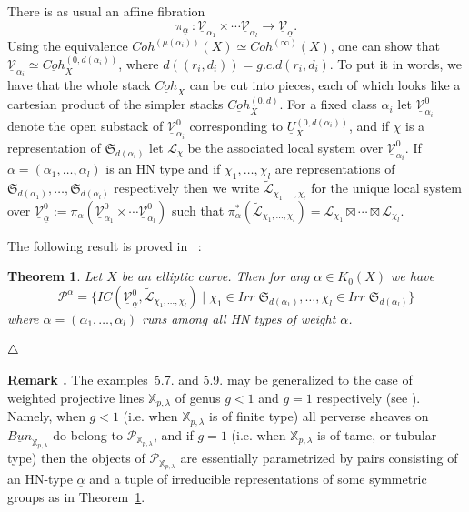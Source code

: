 \documentclass[a4paper,10pt]{amsart}
\def\endexample{$\hfill \triangle$}
\def\endexample{$\hfill \triangle$}
\def\a{\alpha}
\newtheorem{theo}{\bf{Theorem}}[section]
\numberwithin{equation}{section}
\begin{document}
There is as usual an affine fibration
$$\pi_{\underline{\a}}~: \underline{\mathcal{V}}_{\a_1} \times \cdots \underline{\mathcal{V}}_{\a_l} \to \underline{\mathcal{V}}_{\underline{\a}}.$$
Using the equivalence $Coh^{(\mu(\a_i))}(X) \simeq Coh^{(\infty)}(X)$, one can show that $\underline{\mathcal{V}}_{\a_i} \simeq \underline{Coh}_X^{(0,d(\a_i))}$, where $d((r_i,d_i))=g.c.d(r_i,d_i)$. To put it in words, we have that the whole stack $\underline{Coh}_X$ can be cut into pieces, each of which looks like a cartesian product of the simpler stacks $\underline{Coh}_X^{(0,d)}$. For a fixed class $\a_i$ let $\underline{\mathcal{V}}_{\a_i}^0$ denote the open substack of $\underline{\mathcal{V}}_{\a_i}^0$ corresponding to $\underline{U}_X^{(0,d(\a_i))}$, and if $\chi$ is a representation of $\mathfrak{S}_{d(\a_i)}$ let $\mathcal{L}_{\chi}$ be the associated local system over $\underline{\mathcal{V}}_{\a_i}^0$. If $\a=(\a_1, \ldots, \a_l)$ is an HN type and if $\chi_1, \ldots, \chi_l$ are representations of $\mathfrak{S}_{d(\a_1)}, \ldots, \mathfrak{S}_{d(\a_l)}$ respectively then we write $\widetilde{\mathcal{L}}_{\chi_1, \ldots, \chi_l}$ for the unique local system over $\underline{\mathcal{V}}^0_{\underline{\a}}:=\pi_{\a}(\underline{\mathcal{V}}_{\a_1}^0 \times \cdots \underline{\mathcal{V}}_{\a_l}^0)$ such that $\pi_{\a}^*(\widetilde{\mathcal{L}}_{\chi_1, \ldots, \chi_l}) =\mathcal{L}_{\chi_1} \boxtimes \cdots \boxtimes \mathcal{L}_{\chi_l}$. 

\vspace{.1in}

The following result is proved in \cite{Scano}~:

\vspace{.1in}

\begin{theo}\label{T:Pelliptic} Let $X$ be an elliptic curve. Then for any $\a \in K_0(X)$ we have
$$\mathcal{P}^{\a}=\big\{ IC(\underline{\mathcal{V}}^0_{\underline{\a}},\widetilde{\mathcal{L}}_{\chi_1, \ldots, \chi_l})\;|\; \chi_1 \in Irr\;\mathfrak{S}_{d(\a_1)}, \ldots, \chi_l \in Irr\;\mathfrak{S}_{d(\a_l)}\big\}$$
where $\underline{\a}=(\a_1, \ldots, \a_l)$ runs among all HN types of weight $\a$.
\end{theo}
\endexample

\vspace{.2in}

\addtocounter{theo}{1}
\noindent \textbf{Remark \thetheo .} The examples~5.7. and 5.9. may be generalized to the case of weighted projective lines $\mathbb{X}_{p,\lambda}$ of genus $g<1$ and $g=1$ respectively (see \cite{SInvent} ). Namely, when $g<1$ (i.e. when $\mathbb{X}_{p,\lambda}$ is of finite type) all perverse sheaves on $\underline{Bun}_{\mathbb{X}_{p,\lambda}}$ do belong to $\mathcal{P}_{\mathbb{X}_{p,\lambda}}$, and if $g=1$ (i.e. when $\mathbb{X}_{p,\lambda}$ is of tame, or tubular type) then the objects of $\mathcal{P}_{\mathbb{X}_{p,\lambda}}$ are essentially parametrized by pairs consisting of an HN-type $\underline{\a}$ and a tuple of irreducible representations of some symmetric groups as in Theorem~\ref{T:Pelliptic}.
\end{document}
